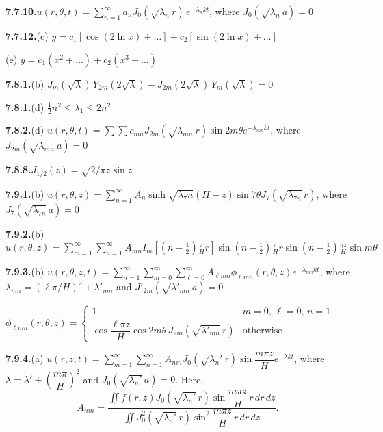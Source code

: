 \medskip
\textbf{7.7.10.}\quad $u(r,\theta,t) = \sum_{n=1}^{\infty} a_n J_0(\sqrt{\lambda_n}\,r)\,e^{-\lambda_n kt}$, where $J_0(\sqrt{\lambda_n}\,a)=0$

\medskip
\textbf{7.7.12.}\quad (c) $y = c_1[\cos(2\ln x) + \ldots] + c_2[\sin(2\ln x) + \ldots]$

\quad (e) $y = c_1(x^2 + \ldots) + c_2(x^3 + \ldots)$

\medskip
\textbf{7.8.1.}\quad (b) $J_m(\sqrt{\lambda})\,Y_{2m}(2\sqrt{\lambda}) - J_{2m}(2\sqrt{\lambda})\,Y_m(\sqrt{\lambda}) = 0$

\medskip
\textbf{7.8.1.}\quad (d) $\frac{1}{2}n^2 \leq \lambda_1 \leq 2n^2$%

\medskip
\textbf{7.8.2.}\quad (d) $u(r,\theta,t) = \sum\sum c_{mn}J_{2m}(\sqrt{\lambda_{mn}}\,r)\sin 2m\theta e^{-\lambda_{mn}kt}$, where $J_{2m}(\sqrt{\lambda_{mn}}\,a)=0$

\medskip
\textbf{7.8.8.}\quad $J_{1/2}(z) = \sqrt{2/\pi z}\sin z$

\medskip
\textbf{7.9.1.}\quad (b) $u(r,\theta,z) = \sum_{n=1}^{\infty}A_n\sinh\sqrt{\lambda_7{n}}(H-z)\sin 7\theta J_7(\sqrt{\lambda_{7n}}\,r)$, where $J_7(\sqrt{\lambda_{7n}}\,a) = 0$%

\medskip
\textbf{7.9.2.}\quad (b) $u(r,\theta,z) = \sum_{m=1}^{\infty}\sum_{n=1}^{\infty}A_{mn}I_m\left[(n-\frac{1}{2})\frac{\pi}{H}r\right]\sin\left(n-\frac{1}{2}\right)\frac{\pi}{H}r\sin\left(n-\frac{1}{2}\right)\frac{\pi z}{H}\sin m\theta$%

\medskip
\textbf{7.9.3.}\quad (b) $u(r,\theta,z,t) = \sum_{n=1}^{\infty}\sum_{m=0}^{\infty}\sum_{\ell=0}^{\infty}A_{\ell mn}\phi_{\ell mn}(r,\theta,z)e^{-\lambda_{mn}kt}$, where $\lambda_{mn} = (\ell\pi/H)^2 + \lambda'_{mn}$ and $J'_{2m}(\sqrt{\lambda'_{mn}}\,a) = 0$

$\phi_{\ell mn}(r,\theta,z) = \begin{cases} 1 & m=0,\,\ell=0,\,n=1 \\ \cos\dfrac{\ell\pi z}{H}\cos 2m\theta\, J_{2m}(\sqrt{\lambda'_{mn}}\,r) & \text{otherwise} \end{cases}$

\medskip
\textbf{7.9.4.}\quad (a) $u(r,z,t) = \sum_{m=1}^{\infty}\sum_{n=1}^{\infty}A_{nm}J_0(\sqrt{\lambda_n'}\,r)\sin\dfrac{m\pi z}{H}e^{-\lambda kt}$, where $\lambda = \lambda'+\left(\dfrac{m\pi}{H}\right)^2$ and $J_0(\sqrt{\lambda_n'}\,a)=0$. Here,
\[
A_{nm} = \dfrac{\iint f(r,z)J_0(\sqrt{\lambda_n'}\,r)\sin\dfrac{m\pi z}{H}\,r\,dr\,dz}{\iint J_0^2(\sqrt{\lambda_n'}\,r)\sin^2\dfrac{m\pi z}{H}\,r\,dr\,dz}.
\]

